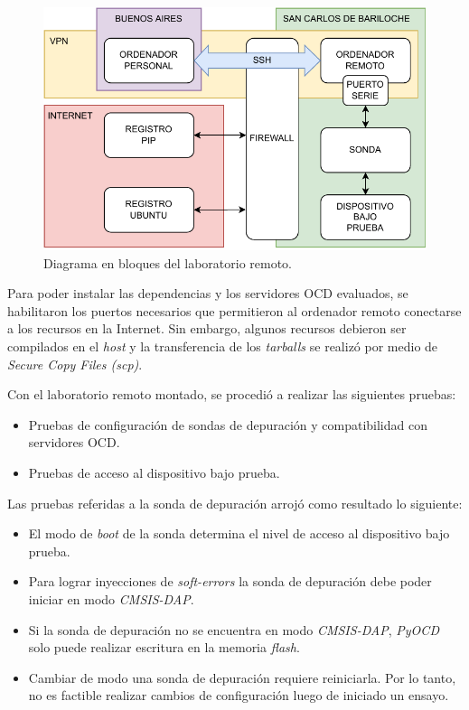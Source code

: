 \begin{figure}[htbp]
	\centering
	\includegraphics[width=\textwidth]{./Figures/vpn.pdf}
    \caption{Diagrama en bloques del laboratorio remoto.}
	\label{fig:remotelab}
\end{figure}

Para poder instalar las dependencias y los servidores OCD evaluados, se habilitaron los puertos necesarios que permitieron al ordenador remoto conectarse a los recursos en la Internet.
Sin embargo, algunos recursos debieron ser compilados en el \emph{host} y la transferencia de los \emph{tarballs} se realizó por medio de \emph{Secure Copy Files (scp)}.

Con el laboratorio remoto montado, se procedió a realizar las siguientes pruebas:
\begin{itemize}
    \item Pruebas de configuración de sondas de depuración y compatibilidad con servidores OCD.
    \item Pruebas de acceso al dispositivo bajo prueba.
\end{itemize}

Las pruebas referidas a la sonda de depuración arrojó como resultado lo siguiente:

\begin{itemize}
    \item El modo de \emph{boot} de la sonda determina el nivel de acceso al dispositivo bajo prueba.
    \item Para lograr inyecciones de \emph{soft-errors} la sonda de depuración debe poder iniciar en modo \emph{CMSIS-DAP}.
    \item Si la sonda de depuración no se encuentra en modo \emph{CMSIS-DAP}, \emph{PyOCD} solo puede realizar escritura en la memoria \emph{flash}.
    \item Cambiar de modo una sonda de depuración requiere reiniciarla.
        Por lo tanto, no es factible realizar cambios de configuración luego de iniciado un ensayo.
\end{itemize}

